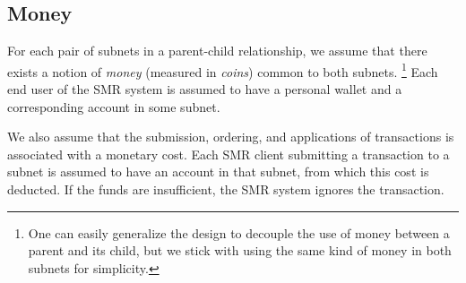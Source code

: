 \subsection{Money}

For each pair of subnets in a parent-child relationship, we assume that there exists a notion of \emph{money} (measured in \emph{coins}) common to both subnets.%
\footnote{One can easily generalize the design to decouple the use of money between a parent and its child, but we stick with using the same kind of money in both subnets for simplicity.}
Each end user of the SMR system is assumed to have a personal wallet and a corresponding account in some subnet.

We also assume that the submission, ordering, and applications of transactions is associated with a monetary cost.
Each SMR client submitting a transaction to a subnet is assumed to have an account in that subnet, from which this cost is deducted.
If the funds are insufficient, the SMR system ignores the transaction.